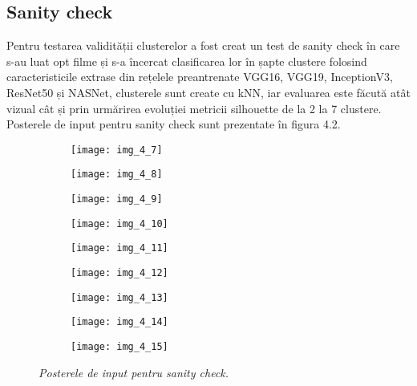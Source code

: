 \subsection{Sanity check}
Pentru testarea validității clusterelor a fost creat un test de sanity check în care s-au luat opt filme și s-a încercat clasificarea lor în șapte clustere folosind caracteristicile extrase din rețelele preantrenate VGG16, VGG19, InceptionV3, ResNet50 și NASNet, clusterele sunt create cu kNN, iar evaluarea este făcută atât vizual cât și prin urmărirea evoluției metricii silhouette de la 2 la 7 clustere. Posterele de input pentru sanity check sunt prezentate în figura 4.2.
\begin{figure}[!h]
  \centering
  \begin{subfigure}[b]{0.48\textwidth}
    \texttt{[image: img\_4\_7]}
  \end{subfigure}
  \hfill
  \begin{subfigure}[b]{0.48\textwidth}
    \texttt{[image: img\_4\_8]}
  \end{subfigure}
    \hfill
  \begin{subfigure}[b]{0.48\textwidth}
    \texttt{[image: img\_4\_9]}
  \end{subfigure}
  \hfill
  \begin{subfigure}[b]{0.48\textwidth}
    \texttt{[image: img\_4\_10]}
  \end{subfigure}
  \hfill
  \begin{subfigure}[b]{0.48\textwidth}
    \texttt{[image: img\_4\_11]}
  \end{subfigure}
  \hfill
  \begin{subfigure}[b]{0.48\textwidth}
    \texttt{[image: img\_4\_12]}
  \end{subfigure}
    \hfill
  \begin{subfigure}[b]{0.48\textwidth}
    \texttt{[image: img\_4\_13]}
  \end{subfigure}
    \hfill
  \begin{subfigure}[b]{0.48\textwidth}
    \texttt{[image: img\_4\_14]}
  \end{subfigure}
      \hfill
  \begin{subfigure}[b]{0.3\textwidth}
    \texttt{[image: img\_4\_15]}
  \end{subfigure}
  \caption[Postere input sanity check]{\textit{Posterele de input pentru sanity check.}}
\end{figure}

